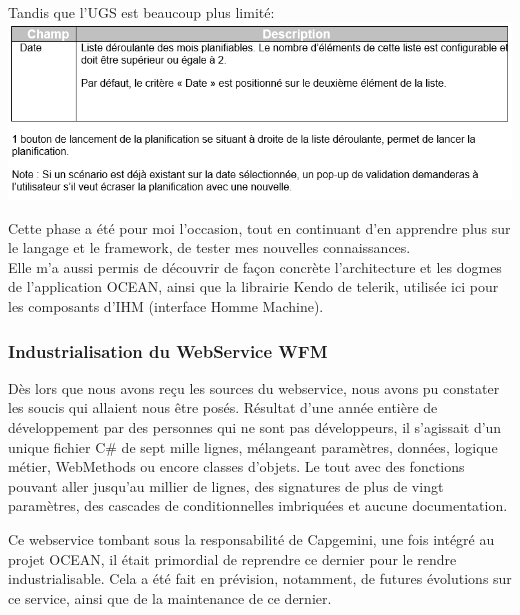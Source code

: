 \documentclass{rapport}
\begin{document}
Tandis que l'UGS est beaucoup plus limité:\\
\includegraphics[width=.95\textwidth]{fig/fig19_PlanoHUGSFonct.png}

Cette phase a été pour moi l'occasion, tout en continuant d'en apprendre plus sur le langage et le framework, de tester mes nouvelles connaissances.\\
Elle m'a aussi permis de découvrir de façon concrète l'architecture et les dogmes de l'application OCEAN, ainsi que la librairie Kendo de telerik, utilisée ici pour les composants d'IHM (interface Homme Machine).\\

\subsubsection{Industrialisation du WebService WFM}

Dès lors que nous avons reçu les sources du webservice, nous avons pu constater les soucis qui allaient nous être posés. Résultat d'une année entière de développement par des personnes qui ne sont pas développeurs, il s'agissait d'un unique fichier C\# de sept mille lignes, mélangeant paramètres, données, logique métier, WebMethods ou encore classes d'objets. Le tout avec des fonctions pouvant aller jusqu'au millier de lignes, des signatures de plus de vingt paramètres, des cascades de conditionnelles imbriquées et aucune documentation.\\


Ce webservice tombant sous la responsabilité de Capgemini, une fois intégré au projet OCEAN, il était primordial de reprendre ce dernier pour le rendre industrialisable. Cela a été fait en prévision, notamment, de futures évolutions sur ce service, ainsi que de la maintenance de ce dernier.\\
\end{document}
